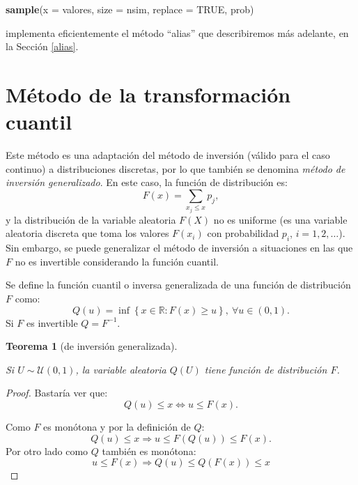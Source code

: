 \documentclass[
  spanish,
  10pt,
]{book}
\newenvironment{Shaded}{\begin{snugshade}}{\end{snugshade}}
\newcommand{\AttributeTok}[1]{\textcolor[rgb]{0.13,0.29,0.53}{#1}}
\newcommand{\ConstantTok}[1]{\textcolor[rgb]{0.56,0.35,0.01}{#1}}
\newcommand{\FunctionTok}[1]{\textcolor[rgb]{0.13,0.29,0.53}{\textbf{#1}}}
\newcommand{\NormalTok}[1]{#1}
\theoremstyle{break}
\newtheorem{theorem}{Teorema}[chapter]
\theoremstyle{nonumberplain}
\newtheorem{proof}{Demostración}
\begin{document}
\begin{Shaded}
\begin{Highlighting}[]
\FunctionTok{sample}\NormalTok{(}\AttributeTok{x =}\NormalTok{ valores, }\AttributeTok{size =}\NormalTok{ nsim, }\AttributeTok{replace =} \ConstantTok{TRUE}\NormalTok{, prob)}
\end{Highlighting}
\end{Shaded}

implementa eficientemente el método ``alias'' que describiremos más adelante, en la Sección \ref{alias}.

\section{Método de la transformación cuantil}\label{transcuant}

Este método es una adaptación del método de inversión (válido para el caso continuo) a distribuciones discretas, por lo que también se denomina \emph{método de inversión generalizado}.
En este caso, la función de distribución es:
\[F\left( x\right)  =\sum_{x_{j}\leq x}p_{j},\]
y la distribución de la variable aleatoria \(F\left( X\right)\) no es uniforme (es una variable aleatoria discreta que toma los valores \(F\left( x_{i} \right)\) con probabilidad \(p_{i}\), \(i=1,2,\ldots\)).
Sin embargo, se puede generalizar el método de inversión a situaciones en las que \(F\) no es invertible considerando la función cuantil.

Se define la función cuantil o inversa generalizada de una función de distribución \(F\) como:
\[Q\left( u\right) =\inf \left\{ x\in \mathbb{R}:F\left( x\right) \geq
u\right\} ,\ \forall u\in \left( 0,1\right).\]
Si \(F\) es invertible \(Q=F^{-1}\).

\begin{theorem}[de inversión generalizada]
\protect\hypertarget{thm:invgen}{}\label{thm:invgen}

Si \(U\sim \mathcal{U}\left( 0,1\right)\), la variable aleatoria \(Q\left( U\right)\) tiene función de distribución \(F\).
\end{theorem}

\begin{proof}
Bastaría ver que:
\[Q\left( u\right) \leq x \Longleftrightarrow u\leq F(x).\]

Como \(F\) es monótona y por la definición de \(Q\):
\[Q\left( u\right) \leq x \Rightarrow u \leq F(Q\left( u\right)) \leq F(x).\]
Por otro lado como \(Q\) también es monótona:
\[u \leq F(x) \Rightarrow Q\left( u\right) \leq Q(F(x)) \leq x\]
\end{proof}
\end{document}
